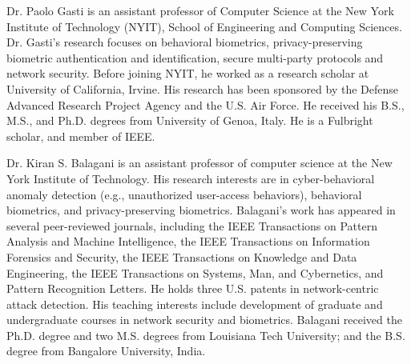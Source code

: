 \documentclass[journal]{IEEEtran}
\begin{document}
\begin{IEEEbiography}{Dr. Paolo Gasti} is an assistant professor of Computer Science at the New York Institute of Technology (NYIT), School of Engineering and Computing Sciences. Dr. Gasti's research focuses on behavioral biometrics, privacy-preserving biometric authentication and identification, secure multi-party protocols and network security. Before joining NYIT, he worked as a research scholar at University of California, Irvine. 
His research has been sponsored by the Defense Advanced Research Project Agency and the U.S. Air Force. He received his B.S., M.S., and Ph.D. degrees from University of Genoa, Italy. He is a Fulbright scholar, and member of IEEE.
\end{IEEEbiography}

\begin{IEEEbiography}{Dr. Kiran S. Balagani} is an assistant professor of computer science at the New York Institute of Technology. His research interests are in cyber-behavioral anomaly detection (e.g., unauthorized user-access behaviors), behavioral biometrics, and privacy-preserving biometrics. Balagani's work has appeared in several peer-reviewed journals, including the IEEE Transactions on Pattern Analysis and Machine Intelligence, the IEEE Transactions on Information Forensics and Security, the IEEE Transactions on Knowledge and Data Engineering, the IEEE Transactions on Systems, Man, and Cybernetics, and Pattern Recognition Letters. He holds three U.S. patents in network-centric attack detection. His teaching interests include development of graduate and undergraduate courses in network security and biometrics. Balagani received the Ph.D. degree and two M.S. degrees from Louisiana Tech University; and the B.S. degree from Bangalore University, India.
\end{IEEEbiography}
\end{document}
